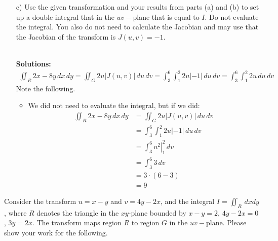 \begin{enumerate}
        \item[c)] Use the given transformation and your results from parts (a) and (b) to set up a double integral that in the $uv-$plane that is equal to $I$. Do not evaluate the integral. You also do not need to calculate the Jacobian and may use that the Jacobian of the transform is  $J(u,v) = -1$. 
            \ifnum {} {\color{DarkBlue} \\[12pt] 
            \textbf{Solutions:}
            \begin{align}
                \iint_{R} 2x-8y \,dx\,dy
                = \iint_{G} 2u \left| J(u,v) \right| \,du\,dv
                = \int_3^6\int_{1}^2 2u \left| -1 \right| \,du\,dv
                = \int_3^6\int_{1}^2 2u \,du\,dv
            \end{align}
            Note the following.
            \begin{itemize}
                \item We did not need to evaluate the integral, but if we did: 
                \begin{align}
                \iint_{R} 2x-8y \,dx\,dy
                &= \iint_{G} 2u \left| J(u,v) \right| \,du\,dv\\
                &= \int_3^6\int_{1}^2 2u \left| -1 \right| \,du\,dv\\
                &= \int_3^6\left. u^2 \right|_{1}^2 \,dv\\
                &= \int_3^6 3 \,dv\\
                &= 3 \cdot(6 -3) \\
                &= 9
            \end{align}
            \end{itemize}
            } 
            \else 
            \fi        
    \end{enumerate}
 
\fi 




\ifnum {}
    \question[6] Consider the transform $u=x-y$ and $v=4y-2x$, and the integral $\displaystyle I = \iint_{R} \,dxdy$, where $R$ denotes the triangle in the $xy$-plane bounded by $x-y=2$, $4y-2x=0$, $3y=2x$. The transform maps region $R$ to region $G$ in the $uv-$plane.  Please show your work for the following.

